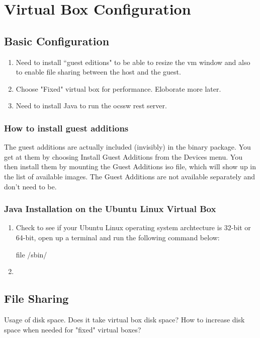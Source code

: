 \documentclass[11pt, oneside]{article}   	%
\begin{document}
\section{\color{DarkGreen}Virtual Box Configuration}

\subsection{Basic Configuration}
\begin{enumerate}
\item Need to install ``guest editions" to be able to resize the vm window and also to enable file sharing between the host and the guest.
\item Choose "Fixed" virtual box for performance. Eloborate more later.
\item Need to install Java to run the ocssw rest server.
\end{enumerate}

\subsubsection{How to install guest additions}
The guest additions are actually included (invisibly) in the binary package. You get at them by choosing Install Guest Additions from the Devices menu.
You then install them by mounting the Guest Additions iso file,
which will show up in the list of available images. The Guest Additions are not available separately and don't need to be.

\subsubsection{Java Installation on the Ubuntu Linux Virtual Box}

\begin{enumerate}
\item Check to see if your Ubuntu Linux operating system archtecture is 32-bit or 64-bit, open up a terminal and run the following command below:
     \begin{code}
             file /sbin/
      \end{code}
\item
\end{enumerate}
\subsection{File Sharing}

Usage of disk space. Does it take virtual box disk space? How to increase disk space when needed for "fixed" virtual boxes?
\end{document}
